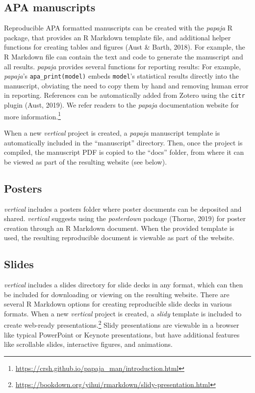 \documentclass[
  english,
  jou,floatsintext]{apa6}
\begin{document}
\hypertarget{apa-manuscripts}{%
\subsection{APA manuscripts}\label{apa-manuscripts}}

Reproducible APA formatted manuscripts can be created with the \emph{papaja} R package, that provides an R Markdown template file, and additional helper functions for creating tables and figures (Aust \& Barth, 2018). For example, the R Markdown file can contain the text and code to generate the manuscript and all results. \emph{papaja} provides several functions for reporting results: For example, \emph{papaja}'s \texttt{apa\_print(model)} embeds \texttt{model}'s statistical results directly into the manuscript, obviating the need to copy them by hand and removing human error in reporting. References can be automatically added from Zotero using the \texttt{citr} plugin (Aust, 2019). We refer readers to the \emph{papaja} documentation website for more information.\footnote{\url{https://crsh.github.io/papaja_man/introduction.html}}

When a new \emph{vertical} project is created, a \emph{papaja} manuscript template is automatically included in the ``manuscript'' directory. Then, once the project is compiled, the manuscript PDF is copied to the ``docs'' folder, from where it can be viewed as part of the resulting website (see below).

\hypertarget{posters}{%
\subsection{Posters}\label{posters}}

\emph{vertical} includes a posters folder where poster documents can be deposited and shared. \emph{vertical} suggests using the \emph{posterdown} package (Thorne, 2019) for poster creation through an R Markdown document. When the provided template is used, the resulting reproducible document is viewable as part of the website.

\hypertarget{slides}{%
\subsection{Slides}\label{slides}}

\emph{vertical} includes a slides directory for slide decks in any format, which can then be included for downloading or viewing on the resulting website. There are several R Markdown options for creating reproducible slide decks in various formats. When a new \emph{vertical} project is created, a \emph{slidy} template is included to create web-ready presentations.\footnote{\url{https://bookdown.org/yihui/rmarkdown/slidy-presentation.html}} Slidy presentations are viewable in a browser like typical PowerPoint or Keynote presentations, but have additional features like scrollable slides, interactive figures, and animations.
\end{document}
